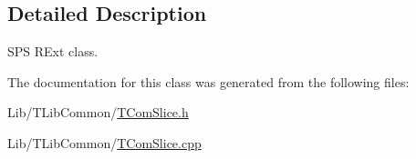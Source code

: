 \subsection{Detailed Description}
S\+PS R\+Ext class. 

The documentation for this class was generated from the following files\+:\begin{DoxyCompactItemize}
\item 
Lib/\+T\+Lib\+Common/\hyperlink{_t_com_slice_8h}{T\+Com\+Slice.\+h}\item 
Lib/\+T\+Lib\+Common/\hyperlink{_t_com_slice_8cpp}{T\+Com\+Slice.\+cpp}\end{DoxyCompactItemize}
